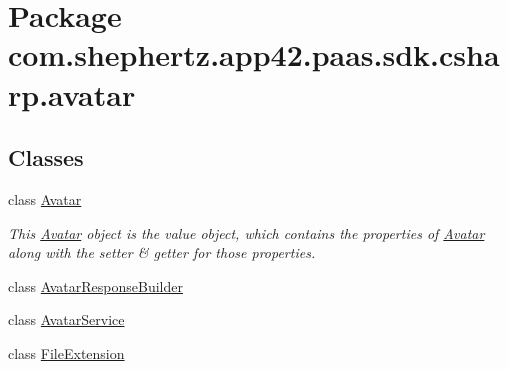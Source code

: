 \hypertarget{namespacecom_1_1shephertz_1_1app42_1_1paas_1_1sdk_1_1csharp_1_1avatar}{\section{Package com.\+shephertz.\+app42.\+paas.\+sdk.\+csharp.\+avatar}
\label{namespacecom_1_1shephertz_1_1app42_1_1paas_1_1sdk_1_1csharp_1_1avatar}
}
\subsection*{Classes}
\begin{DoxyCompactItemize}
\item 
class \hyperlink{classcom_1_1shephertz_1_1app42_1_1paas_1_1sdk_1_1csharp_1_1avatar_1_1_avatar}{Avatar}
\begin{DoxyCompactList}\small\item\em This \hyperlink{classcom_1_1shephertz_1_1app42_1_1paas_1_1sdk_1_1csharp_1_1avatar_1_1_avatar}{Avatar} object is the value object, which contains the properties of \hyperlink{classcom_1_1shephertz_1_1app42_1_1paas_1_1sdk_1_1csharp_1_1avatar_1_1_avatar}{Avatar} along with the setter \& getter for those properties. \end{DoxyCompactList}\item 
class \hyperlink{classcom_1_1shephertz_1_1app42_1_1paas_1_1sdk_1_1csharp_1_1avatar_1_1_avatar_response_builder}{Avatar\+Response\+Builder}
\item 
class \hyperlink{classcom_1_1shephertz_1_1app42_1_1paas_1_1sdk_1_1csharp_1_1avatar_1_1_avatar_service}{Avatar\+Service}
\item 
class \hyperlink{classcom_1_1shephertz_1_1app42_1_1paas_1_1sdk_1_1csharp_1_1avatar_1_1_file_extension}{File\+Extension}
\end{DoxyCompactItemize}
